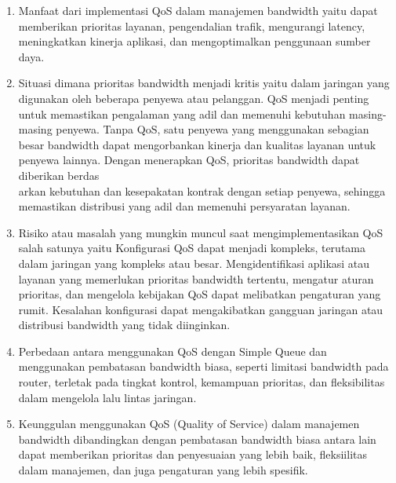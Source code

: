 \begin{enumerate}
    \item Manfaat dari implementasi QoS dalam manajemen bandwidth yaitu dapat memberikan prioritas layanan, pengendalian trafik, mengurangi latency,\\ meningkatkan kinerja aplikasi, dan mengoptimalkan penggunaan sumber daya.

    \item Situasi dimana prioritas bandwidth menjadi kritis yaitu dalam jaringan yang digunakan oleh beberapa penyewa atau pelanggan. QoS menjadi penting untuk memastikan pengalaman yang adil dan memenuhi kebutuhan masing-masing penyewa. Tanpa QoS, satu penyewa yang menggunakan sebagian besar bandwidth dapat mengorbankan kinerja dan kualitas layanan untuk penyewa lainnya. Dengan menerapkan QoS, prioritas bandwidth dapat diberikan berdas\\arkan kebutuhan dan kesepakatan kontrak dengan setiap penyewa, sehingga memastikan distribusi yang adil dan memenuhi persyaratan layanan.
    
    \item Risiko atau masalah yang mungkin muncul saat mengimplementasikan QoS salah satunya yaitu Konfigurasi QoS dapat menjadi kompleks, terutama dalam jaringan yang kompleks atau besar. Mengidentifikasi aplikasi atau layanan yang memerlukan prioritas bandwidth tertentu, mengatur aturan prioritas, dan mengelola kebijakan QoS dapat melibatkan pengaturan yang rumit. Kesalahan konfigurasi dapat mengakibatkan gangguan jaringan atau distribusi bandwidth yang tidak diinginkan.
    
    \item Perbedaan antara menggunakan QoS dengan Simple Queue dan menggunakan pembatasan bandwidth biasa, seperti limitasi bandwidth pada router, terletak pada tingkat kontrol, kemampuan prioritas, dan fleksibilitas dalam mengelola lalu lintas jaringan.
    
    \item Keunggulan menggunakan QoS (Quality of Service) dalam manajemen bandwidth dibandingkan dengan pembatasan bandwidth biasa antara lain dapat memberikan prioritas dan penyesuaian yang lebih baik, fleksiilitas dalam manajemen, dan juga pengaturan yang lebih spesifik.
    
\end{enumerate}
